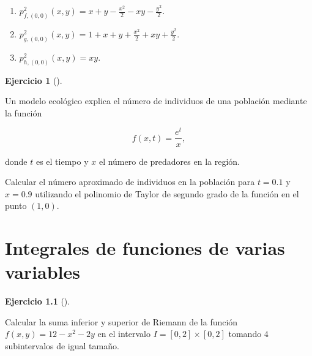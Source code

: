 \documentclass[
  a4paper,
]{scrreport}
\theoremstyle{definition}
\newtheorem{exercise}{Ejercicio}[chapter]
\theoremstyle{remark}
\begin{document}
\begin{tcolorbox}[enhanced jigsaw, toprule=.15mm, coltitle=black, colframe=quarto-callout-tip-color-frame, leftrule=.75mm, breakable, left=2mm, opacitybacktitle=0.6, colbacktitle=quarto-callout-tip-color!10!white, bottomrule=.15mm, opacityback=0, title=\textcolor{quarto-callout-tip-color}{\faLightbulb}\hspace{0.5em}{Solución}, bottomtitle=1mm, toptitle=1mm, titlerule=0mm, colback=white, arc=.35mm, rightrule=.15mm]

\begin{enumerate}
\def\labelenumi{\alph{enumi}.}
\item
  \(p^2_{f,(0,0)}(x,y) = x + y -\frac{x^2}{2} - xy -\frac{y^2}{2}\).
\item
  \(p^2_{g,(0,0)}(x,y) = 1 + x + y +\frac{x^2}{2} + xy +\frac{y^2}{2}\).
\item
  \(p^2_{h,(0,0)}(x,y) = xy\).
\end{enumerate}

\end{tcolorbox}

\begin{exercise}[]\protect\hypertarget{exr-polinomio-taylor-modelo-ecologico}{}\label{exr-polinomio-taylor-modelo-ecologico}

Un modelo ecológico explica el número de individuos de una población
mediante la función

\[f(x,t)=\dfrac{e^t}{x},\]

donde \(t\) es el tiempo y \(x\) el número de predadores en la región.

Calcular el número aproximado de individuos en la población para
\(t=0.1\) y \(x=0.9\) utilizando el polinomio de Taylor de segundo grado
de la función en el punto \((1,0)\).

\end{exercise}


\hypertarget{integrales-de-funciones-de-varias-variables}{%
\chapter{Integrales de funciones de varias
variables}\label{integrales-de-funciones-de-varias-variables}}

\begin{exercise}[]\protect\hypertarget{exr-sumas-riemann-n-dimensional}{}\label{exr-sumas-riemann-n-dimensional}

Calcular la suma inferior y superior de Riemann de la función
\(f(x,y)=12-x^2-2y\) en el intervalo \(I=[0,2]\times[0,2]\) tomando
\(4\) subintervalos de igual tamaño.

\end{exercise}
\end{document}
